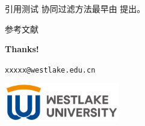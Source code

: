 \documentclass[11pt]{beamer}
\makeatletter
\newcommand{\email}{xxxxx@westlake.edu.cn}
\makeatother
\begin{document}

\begin{frame}{引用测试}
  协同过滤方法最早由 \cite{hu2008collaborative}提出。
\end{frame}



    
% 
% 

\begin{frame}[allowframebreaks]{参考文献}
  
  
\end{frame}



\begin{frame}
  \centering
  \vspace{1cm}
  
  {\textbf{Thanks!}}
  
  \vspace{1cm}
  
  \texttt{\email}
  
  \vspace{0.8cm}
  
  \includegraphics[width=5cm]{./pic/logo3.png}
  
\end{frame}

  
\end{document}
